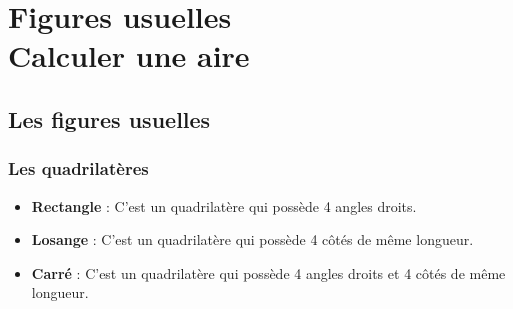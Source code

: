 \documentclass[a4paper]{book}
\begin{document}
\setcounter{chapter}{14} 
\renewcommand{\monTitre}{Figures usuelles \\ Calculer une aire}
\chapter{\monTitre}
\thispagestyle{fancy}

\section{Les figures usuelles}

\subsection{Les quadrilatères}

    \begin{definition}
        \begin{itemize}
            \item \textbf{Rectangle} : C'est un quadrilatère qui possède 4 angles droits.
            \item \textbf{Losange} : C'est un quadrilatère qui possède 4 côtés de même longueur.
            \item \textbf{Carré} : C'est un quadrilatère qui possède 4 angles droits et 4 côtés de même longueur.
        \end{itemize}
    \end{definition}
    
\end{document}
